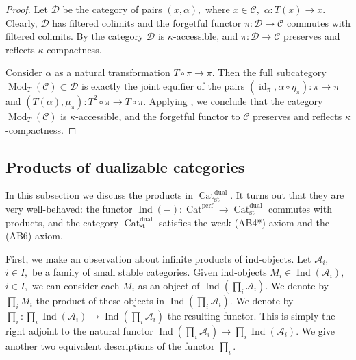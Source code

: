 \documentclass[11pt,leqno]{amsart}
\numberwithin{equation}{section}
\newcommand{\Cat}{\operatorname{Cat}}
\newcommand{\st}{\operatorname{st}}
\newcommand{\dual}{\operatorname{dual}}
\newcommand{\cD}{{\mathcal D}}
\newcommand{\cA}{{\mathcal A}}
\newcommand{\cC}{{\mathcal C}}
\newcommand{\cE}{{\mathcal E}}
\newcommand{\perf}{\operatorname{perf}}
\newcommand{\Ind}{\operatorname{Ind}}
\newcommand{\id}{\operatorname{id}}
\newcommand{\Mod}{\operatorname{Mod}}
\begin{document}
\begin{proof}


Let $\cD$ be the category of pairs $(x,\alpha),$ where $x\in\cC,$ $\alpha:T(x)\to x.$ Clearly, $\cD$ has filtered colimits and the forgetful functor $\pi:\cD\to\cC$ commutes with filtered colimits. By \cite[Theorem 4.1]{Pos} the category $\cD$ is $\kappa$-accessible, and $\pi:\cD\to\cC$ preserves and reflects $\kappa$-compactness. 

Consider $\alpha$ as a natural transformation $T\circ\pi\to\pi.$ Then the full subcategory $\Mod_T(\cC)\subset\cD$ is exactly the joint equifier of the pairs $(\id_{\pi},\alpha\circ\eta_{\pi}):\pi\to\pi$ and $(T(\alpha),\mu_{\pi}):T^2\circ\pi\to T\circ\pi.$ Applying \cite[Theorem 3.1]{Pos}, we conclude that the category $\Mod_T(\cC)$ is $\kappa$-accessible, and the forgetful functor to $\cC$ preserves and reflects $\kappa$-compactness.
\end{proof}

\subsection{Products of dualizable categories}
\label{ssec:products_of_dualizable}

In this subsection we discuss the products in $\Cat_{\st}^{\dual}.$ It turns out that they are very well-behaved: the functor $\Ind(-):\Cat^{\perf}\to\Cat_{\st}^{\dual}$ commutes with products, and the category $\Cat_{\st}^{\dual}$ satisfies the weak (AB4*) axiom and the (AB6) axiom. 

First, we make an observation about infinite products of ind-objects. Let $\cA_i,$ $i\in I,$ be a family of small stable categories. Given ind-objects $M_i\in\Ind(\cA_i),$ $i\in I,$ we can consider each $M_i$ as an object of $\Ind(\prod_i\cA_i).$ We denote by $\prod_i M_i$ the product of these objects in $\Ind(\prod_i\cA_i).$ We denote by $\prod_i:\prod_i\Ind(\cA_i)\to\Ind(\prod_i\cA_i)$ the resulting functor. This is simply the right adjoint to the natural functor $\Ind(\prod_i\cA_i)\to\prod_i\Ind(\cA_i).$ We give another two equivalent descriptions of the functor $\prod_i.$
\end{document}
